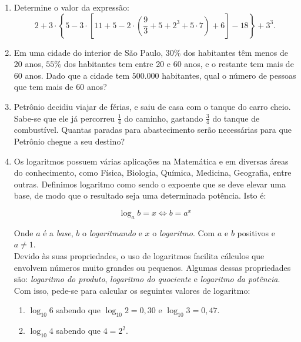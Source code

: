 \documentclass[a4paper, 12pt]{article}
\newcommand{\PR}[1]{\ensuremath{\left[#1\right]}} %
\newcommand{\PC}[1]{\ensuremath{\left(#1\right)}}
\newcommand{\chav}[1]{\ensuremath{\left\{#1\right\}}}
\begin{document}
	
	\begin{enumerate}
	
	\item Determine o valor da expressão:
	$$ 2 + 3 \cdot \chav{5 - 3 \cdot \PR{ 11 + 5 - 2 \cdot \PC{\frac{9}{3} + 5 + 2^3 + 5 \cdot 7} + 6 } -18 } + 3^3  .$$
\vspace{0.01cm}

	
	\item Em uma cidade do interior de São Paulo, $30\%$ dos habitantes têm menos de 20 anos, $55\%$ dos habitantes tem entre 20 e 60 anos, e o restante tem mais de 60 anos. Dado que a cidade tem $500.000$ habitantes, qual o número de pessoas que tem mais de 60 anos?
\vspace{0.7cm}	
	
	
	
	
	\item Petrônio decidiu viajar de férias, e saiu de casa com o tanque do carro cheio. Sabe-se que ele já percorreu $\frac{1}{4}$ do caminho, gastando $\frac{3}{4}$ do tanque de combustível. Quantas paradas para abastecimento serão necessárias para que Petrônio chegue a seu destino?
\vspace{0.7cm}
	
	
	
	
	\item Os logaritmos possuem várias aplicações na Matemática e em diversas áreas do conhecimento, como Física, Biologia, Química, Medicina, Geografia, entre outras. Definimos logaritmo como sendo o expoente que se deve elevar uma base, de modo que o resultado seja uma determinada potência. Isto é:

			$$ \log_a b = x \Longleftrightarrow b = a^x $$

Onde $a$ é a \textit{base}, $b$ o \textit{logaritmando} e $x$ o \textit{logaritmo}. Com $a$ e $b$ positivos e $a \neq 1$. \\

Devido às suas propriedades, o uso de logaritmos facilita cálculos que envolvem números muito grandes ou pequenos. Algumas dessas propriedades são: \textit{logaritmo do produto}, \textit{logaritmo do quociente} e \textit{logaritmo da potência}. Com isso, pede-se para calcular os seguintes valores de logaritmo:

		\begin{enumerate}
   		 \item $\log_{10}6$ sabendo que $\log_{10} 2 = 0,30$ e $\log_{10} 3 = 0,47$.
    
    		\item $\log_{10}4$ sabendo que $4 = 2^2$.
    

\end{enumerate}
\end{enumerate}
\end{document}
